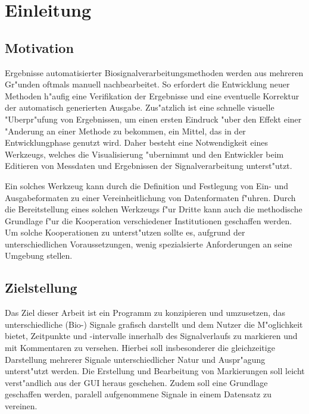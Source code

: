 \chapter{Einleitung}

\section{Motivation}

Ergebnisse automatisierter Biosignalverarbeitungsmethoden werden aus mehreren Gr"unden oftmals manuell nachbearbeitet.
So erfordert die Entwicklung neuer Methoden h"aufig eine Verifikation der Ergebnisse und eine eventuelle Korrektur der automatisch generierten Ausgabe.
Zus"atzlich ist eine schnelle visuelle "Uberpr"ufung von Ergebnissen, um einen ersten Eindruck "uber den Effekt einer "Anderung an einer Methode zu bekommen, ein Mittel, das in der Entwicklungphase genutzt wird.
Daher besteht eine Notwendigkeit eines Werkzeugs, welches die Visualisierung "ubernimmt und den Entwickler beim Editieren von Messdaten und Ergebnissen der Signalverarbeitung unterst"utzt.

Ein solches Werkzeug kann durch die Definition und Festlegung von Ein- und Ausgabeformaten zu einer Vereinheitlichung von Datenformaten f"uhren.
Durch die Bereitstellung eines solchen Werkzeugs f"ur Dritte kann auch die methodische Grundlage f"ur die Kooperation verschiedener Institutionen geschaffen werden.
Um solche Kooperationen zu unterst"utzen sollte es, aufgrund der unterschiedlichen Voraussetzungen, wenig spezialsierte Anforderungen an seine Umgebung stellen.



\section{Zielstellung}
\label{sec:zielstellung}

Das Ziel dieser Arbeit ist ein Programm zu konzipieren und umzusetzen, das unterschiedliche (Bio-) Signale grafisch darstellt und dem Nutzer die M"oglichkeit bietet, Zeitpunkte und -intervalle innerhalb des Signalverlaufs zu markieren und mit Kommentaren zu versehen.
Hierbei soll insbesonderer die gleichzeitige Darstellung mehrerer Signale unterschiedlicher Natur und Auspr"agung unterst"utzt werden.
Die Erstellung und Bearbeitung von Markierungen soll leicht verst"andlich aus der \ac{GUI} heraus geschehen.
Zudem soll eine Grundlage geschaffen werden, paralell aufgenommene Signale in einem Datensatz zu vereinen.

